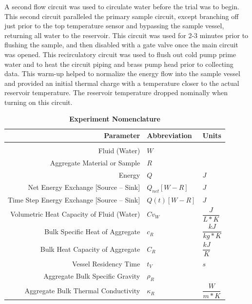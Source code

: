 \documentclass[12pt]{article}
\numberwithin{equation}{section}
\numberwithin{table}{section}
\numberwithin{figure}{section}
\begin{document}
A second flow circuit was used to circulate water before the trial was to begin. This second circuit paralleled the primary sample circuit, except branching off just prior to the top temperature sensor and bypassing the sample vessel, returning all water to the reservoir. This circuit was used for 2-3 minutes prior to flushing the sample, and then disabled with a gate valve once the main circuit was opened. This recirculatory circuit was used to flush out cold pump prime water and to heat the circuit piping and brass pump head prior to collecting data. This warm-up helped to normalize the energy flow into the sample vessel and provided an initial thermal charge with a temperature closer to the actual reservoir temperature. The reservoir temperature dropped nominally when turning on this circuit. 

\begin{table}[ht!]
\caption[Experiment Nomenclature]{\textbf{Experiment Nomenclature}\label{simNom}}
\centering
\begin{tabular}{r l l}
Parameter & Abbreviation & Units\\
\hline
\\[-.5ex]
Fluid (Water)					&	$W$\\[3mm]

Aggregate Material or Sample			& 	$R$\\[3mm]

Energy						&	$Q$			& $J$\\[3mm]

Net Energy Exchange [Source -- Sink]		&	$Q_{net}[W-R]$		& $J$\\[3mm]

Time Step Energy Exchange [Source -- Sink]	&	$Q(t)[W-R]$		& $J$\\[3mm]

Volumetric Heat Capacity of Fluid (Water)	&	$Cv_{W}$		& $\dfrac{J}{L*K}$\\[3mm]

Bulk Specific Heat of Aggregate			&	$c_{R}$			& $\dfrac{kJ}{kg*K}$\\[3mm]

Bulk Heat Capacity of Aggregate			&	$C_{R}$			& $\dfrac{kJ}{K}$\\[3mm]

Vessel Residency Time 				&	$t_{V}$			& $s$\\[3mm]

Aggregate Bulk Specific Gravity			&	$\rho_{R}$		&\\[3mm]

Aggregate Bulk Thermal Conductivity		&	$\kappa_{R}$		& $\dfrac{W}{m*K}$\\[3mm]


\end{tabular}
\end{table}
\end{document}

